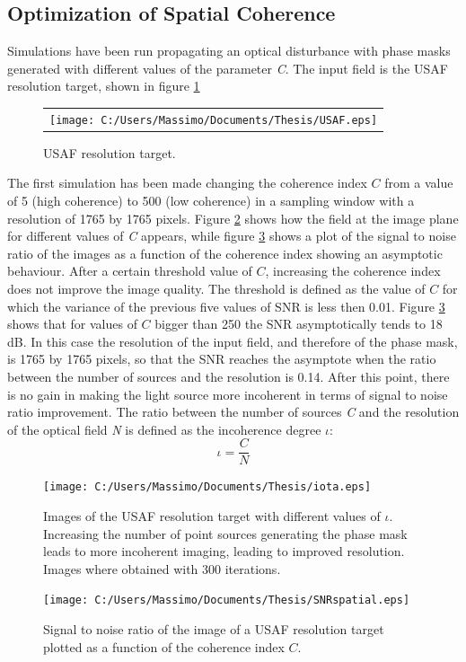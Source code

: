  \subsection{Optimization of Spatial Coherence}
 Simulations have been run propagating an optical disturbance with phase masks generated with different values of the parameter \textit{C}.
 The input field is the USAF resolution target, shown in figure \ref{fig:USAF}
 \begin{figure}[H]
 	\begin{center}
 		\begin{tabular}{c}
 			\texttt{[image: C:/Users/Massimo/Documents/Thesis/USAF.eps]}
 		\end{tabular}
 	\end{center}
 	\caption{ \label{fig:USAF} 
 		USAF resolution target. }
 \end{figure} 
 The first simulation has been made changing the coherence index $C$ from a value of 5 (high coherence) to 500 (low coherence) in a sampling window with a resolution of 1765 by 1765 pixels.
 Figure \ref{fig:spatialsnr2} shows how the field at the image plane for different values of \textit{C} appears, while figure \ref{fig:spatialsnr1} shows a plot of the signal to noise ratio of the images as a function of the coherence index showing an asymptotic behaviour. After a certain threshold value of $C$, increasing the coherence index does not improve the image quality. The threshold is defined as the value of $C$ for which the variance of the previous five values of SNR is less then 0.01.
Figure \ref{fig:spatialsnr1} shows that for values of $C$ bigger than 250 the SNR asymptotically tends to 18 dB. In this case the resolution of the input field, and therefore of the phase mask, is 1765 by 1765 pixels, so that the SNR reaches the asymptote when the ratio between the number of sources and the resolution is 0.14. After this point, there is no gain in making the light source more incoherent in terms of signal to noise ratio improvement.
The ratio between the number of sources \textit{C} and the resolution of the optical field \textit{N} is defined as the incoherence degree $\iota$:
\begin{equation}
\label{eq:incoherence_degree}
\iota = \dfrac{C}{N}
\end{equation}
\begin{figure}[H]
 	\centering
 	\texttt{[image: C:/Users/Massimo/Documents/Thesis/iota.eps]}
 	\caption{\label{fig:spatialsnr2}Images of the USAF resolution target with different values of $\iota$. Increasing the number of point sources generating the phase mask leads to more incoherent imaging, leading to improved resolution. Images where obtained with 300 iterations.}
 \end{figure}
 \begin{figure}[H]
 	\centering
 	\texttt{[image: C:/Users/Massimo/Documents/Thesis/SNRspatial.eps]}
 	\caption{\label{fig:spatialsnr1}Signal to noise ratio of the image of a USAF resolution target plotted as a function of the coherence index $C$.}
 \end{figure}
 \newpage

